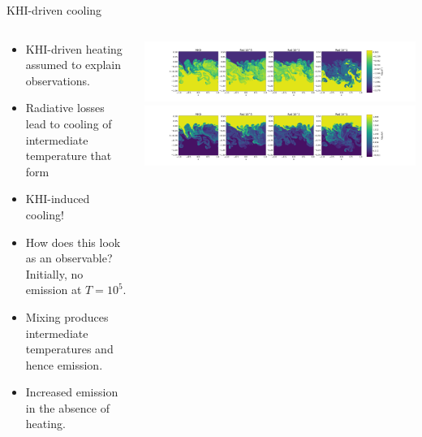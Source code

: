 \documentclass[10pt,aspectratio=169,usenames,dvipsnames]{beamer}
\begin{document}
\begin{frame}{KHI-driven cooling}
\begin{columns}
\begin{column}{0.6\textwidth}
\begin{itemize}
    \item KHI-driven heating assumed to explain observations.
    \item Radiative losses lead to cooling of intermediate temperature that form
    \item KHI-induced cooling!
    \item How does this look as an observable? Initially, no emission at $T=10^5$. 
    \item Mixing produces intermediate temperatures and hence emission.
    \item Increased emission in the absence of heating.
\end{itemize}
\end{column}
\begin{column}{0.4\textwidth}
   \includegraphics[width=0.99\linewidth,clip=true,trim=58.9cm 0.8cm 8.9cm 0.8cm]{2023Dundee/Figures/denstempevo_T_t0071.png} \\
   \includegraphics[width=0.99\linewidth,clip=true,trim=58.9cm 0.8cm 8.9cm 0.8cm]{2023Dundee/Figures/denstempevo_rho_t0071.png}
\end{column}
\end{columns}
\end{frame}
\end{document}
